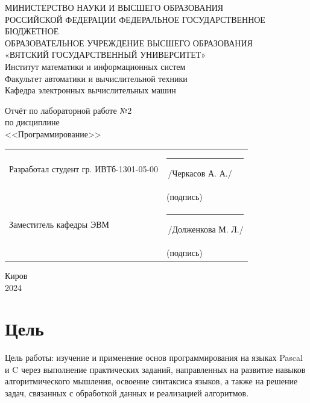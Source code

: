\documentclass[oneside,a4paper,14pt]{extarticle}
\begin{document}
\newpage
\thispagestyle{empty}
\begin{center}
	МИНИСТЕРСТВО НАУКИ И ВЫСШЕГО ОБРАЗОВАНИЯ\\
	РОССИЙСКОЙ ФЕДЕРАЦИИ
	ФЕДЕРАЛЬНОЕ ГОСУДАРСТВЕННОЕ БЮДЖЕТНОЕ\\
	ОБРАЗОВАТЕЛЬНОЕ
	УЧРЕЖДЕНИЕ ВЫСШЕГО ОБРАЗОВАНИЯ\\
	«ВЯТСКИЙ ГОСУДАРСТВЕННЫЙ УНИВЕРСИТЕТ»\\
	Институт математики и информационных систем\\
	Факультет автоматики и вычислительной техники\\
	Кафедра электронных вычислительных машин
\end{center}
\vspace{20mm}

\begin{center}
	Отчёт по лабораторной работе №2\\
	по дисциплине\\
	<<Программирование>>\\
\end{center}
\vspace{40mm}
\noindent
\begin{tabular}{ll}
	Разработал студент гр. ИВТб-1301-05-00 & \rule[-1mm]{30mm}{0.10mm}\,/Черкасов А. А./   \\
	                                       & \hspace{8mm}\footnotesize(подпись)            \\

	Заместитель кафедры ЭВМ                & \rule[-1mm]{30mm}{0.10mm}\,/Долженкова М. Л./ \\
	                                       & \hspace{8mm}\footnotesize(подпись)            \\
\end{tabular}

\vfill
\begin{center}
	Киров\\
	2024
\end{center}

\newpage\thispagestyle{plain}

\section*{Цель}

\sloppy Цель работы: изучение и применение основ программирования на языках Pascal и C через выполнение практических заданий, направленных на развитие навыков алгоритмического мышления, освоение синтаксиса языков, а также на решение задач, связанных с обработкой данных и реализацией алгоритмов.
\end{document}
